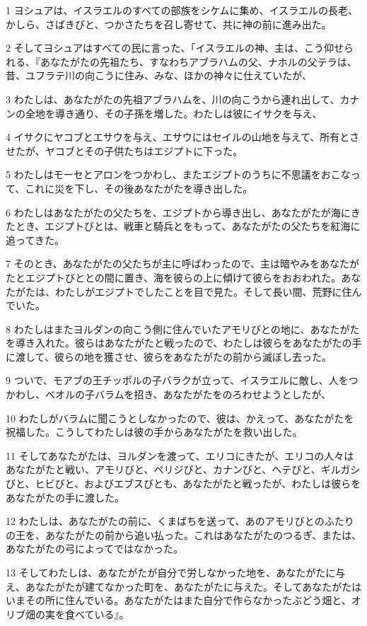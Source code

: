 \par 1 ヨシュアは、イスラエルのすべての部族をシケムに集め、イスラエルの長老、かしら、さばきびと、つかさたちを召し寄せて、共に神の前に進み出た。
\par 2 そしてヨシュアはすべての民に言った、「イスラエルの神、主は、こう仰せられる、『あなたがたの先祖たち、すなわちアブラハムの父、ナホルの父テラは、昔、ユフラテ川の向こうに住み、みな、ほかの神々に仕えていたが、
\par 3 わたしは、あなたがたの先祖アブラハムを、川の向こうから連れ出して、カナンの全地を導き通り、その子孫を増した。わたしは彼にイサクを与え、
\par 4 イサクにヤコブとエサウを与え、エサウにはセイルの山地を与えて、所有とさせたが、ヤコブとその子供たちはエジプトに下った。
\par 5 わたしはモーセとアロンをつかわし、またエジプトのうちに不思議をおこなって、これに災を下し、その後あなたがたを導き出した。
\par 6 わたしはあなたがたの父たちを、エジプトから導き出し、あなたがたが海にきたとき、エジプトびとは、戦車と騎兵とをもって、あなたがたの父たちを紅海に追ってきた。
\par 7 そのとき、あなたがたの父たちが主に呼ばわったので、主は暗やみをあなたがたとエジプトびととの間に置き、海を彼らの上に傾けて彼らをおおわれた。あなたがたは、わたしがエジプトでしたことを目で見た。そして長い間、荒野に住んでいた。
\par 8 わたしはまたヨルダンの向こう側に住んでいたアモリびとの地に、あなたがたを導き入れた。彼らはあなたがたと戦ったので、わたしは彼らをあなたがたの手に渡して、彼らの地を獲させ、彼らをあなたがたの前から滅ぼし去った。
\par 9 ついで、モアブの王チッポルの子バラクが立って、イスラエルに敵し、人をつかわし、ベオルの子バラムを招き、あなたがたをのろわせようとしたが、
\par 10 わたしがバラムに聞こうとしなかったので、彼は、かえって、あなたがたを祝福した。こうしてわたしは彼の手からあなたがたを救い出した。
\par 11 そしてあなたがたは、ヨルダンを渡って、エリコにきたが、エリコの人々はあなたがたと戦い、アモリびと、ペリジびと、カナンびと、ヘテびと、ギルガシびと、ヒビびと、およびエブスびとも、あなたがたと戦ったが、わたしは彼らをあなたがたの手に渡した。
\par 12 わたしは、あなたがたの前に、くまばちを送って、あのアモリびとのふたりの王を、あなたがたの前から追い払った。これはあなたがたのつるぎ、または、あなたがたの弓によってではなかった。
\par 13 そしてわたしは、あなたがたが自分で労しなかった地を、あなたがたに与え、あなたがたが建てなかった町を、あなたがたに与えた。そしてあなたがたはいまその所に住んでいる。あなたがたはまた自分で作らなかったぶどう畑と、オリブ畑の実を食べている』。
